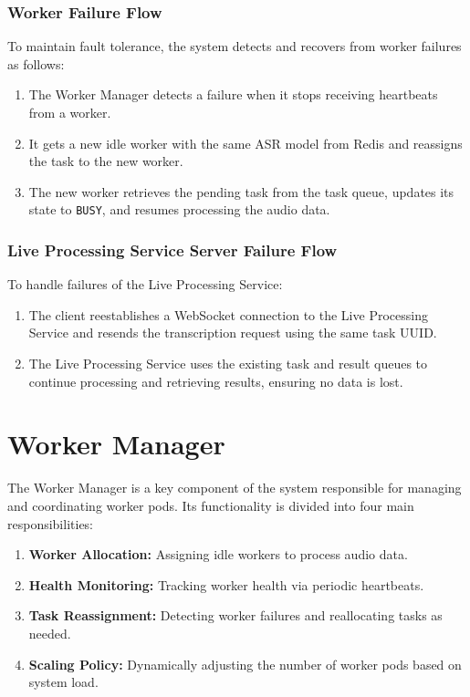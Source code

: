 \subsubsection{Worker Failure Flow}
To maintain fault tolerance, the system detects and recovers from worker failures as follows:
\begin{enumerate}
    \item The Worker Manager detects a failure when it stops receiving heartbeats from a worker.
    \item It gets a new idle worker with the same ASR model from Redis and reassigns the task to the new worker.
    \item The new worker retrieves the pending task from the task queue, updates its state to \texttt{BUSY}, and resumes processing the audio data.
\end{enumerate}

\subsubsection{Live Processing Service Server Failure Flow}
To handle failures of the Live Processing Service:
\begin{enumerate}
    \item The client reestablishes a WebSocket connection to the Live Processing Service and resends the transcription request using the same task UUID.
    \item The Live Processing Service uses the existing task and result queues to continue processing and retrieving results, ensuring no data is lost.
\end{enumerate}

\section{Worker Manager} \label{section:worker_manager}
The Worker Manager is a key component of the system responsible for managing and coordinating worker pods. Its functionality is divided into four main responsibilities:
\begin{enumerate}
    \item \textbf{Worker Allocation:} Assigning idle workers to process audio data.
    \item \textbf{Health Monitoring:} Tracking worker health via periodic heartbeats.
    \item \textbf{Task Reassignment:} Detecting worker failures and reallocating tasks as needed.
    \item \textbf{Scaling Policy:} Dynamically adjusting the number of worker pods based on system load.
\end{enumerate}


